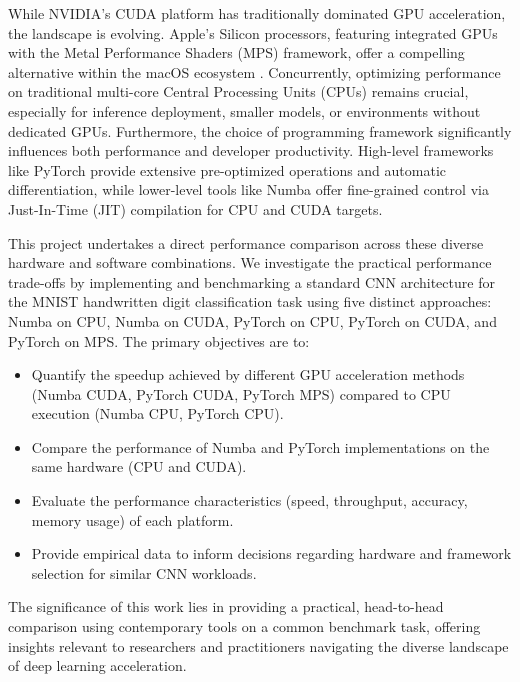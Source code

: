 \documentclass[conference]{IEEEtran} %
\begin{document}
While NVIDIA's CUDA platform has traditionally dominated GPU acceleration, the landscape is evolving. Apple's Silicon processors, featuring integrated GPUs with the Metal Performance Shaders (MPS) framework, offer a compelling alternative within the macOS ecosystem \cite{Hubner2025}. Concurrently, optimizing performance on traditional multi-core Central Processing Units (CPUs) remains crucial, especially for inference deployment, smaller models, or environments without dedicated GPUs. Furthermore, the choice of programming framework significantly influences both performance and developer productivity. High-level frameworks like PyTorch provide extensive pre-optimized operations and automatic differentiation, while lower-level tools like Numba offer fine-grained control via Just-In-Time (JIT) compilation for CPU and CUDA targets.

This project undertakes a direct performance comparison across these diverse hardware and software combinations. We investigate the practical performance trade-offs by implementing and benchmarking a standard CNN architecture for the MNIST handwritten digit classification task \cite{LeCun1998} using five distinct approaches: Numba on CPU, Numba on CUDA, PyTorch on CPU, PyTorch on CUDA, and PyTorch on MPS. The primary objectives are to:
\begin{itemize}
    \item Quantify the speedup achieved by different GPU acceleration methods (Numba CUDA, PyTorch CUDA, PyTorch MPS) compared to CPU execution (Numba CPU, PyTorch CPU).
    \item Compare the performance of Numba and PyTorch implementations on the same hardware (CPU and CUDA).
    \item Evaluate the performance characteristics (speed, throughput, accuracy, memory usage) of each platform.
    \item Provide empirical data to inform decisions regarding hardware and framework selection for similar CNN workloads.
\end{itemize}
The significance of this work lies in providing a practical, head-to-head comparison using contemporary tools on a common benchmark task, offering insights relevant to researchers and practitioners navigating the diverse landscape of deep learning acceleration.
\end{document}
